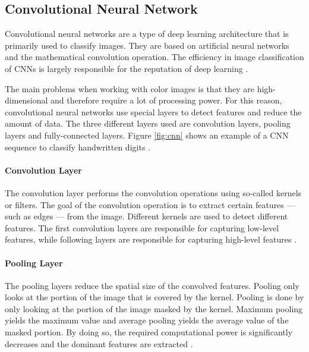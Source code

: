 \subsection{Convolutional Neural Network}
\label{subsec:cnn}

Convolutional neural networks are a type of deep learning architecture that is primarily used to classify images.
They are based on artificial neural networks and the mathematical convolution operation.
The efficiency in image classification of CNNs is largely responsible for the reputation of deep learning \cite{cnn_pathmind}.

The main problems when working with color images is that they are high-dimensional and therefore require a lot of processing power.
For this reason, convolutional neural networks use special layers to detect features and reduce the amount of data.
The three different layers used are convolution layers, pooling layers and fully-connected layers.
Figure \ref{fig:cnn} shows an example of a CNN sequence to classify handwritten digits \cite{cnn_pathmind}.

\paragraph{Convolution Layer}
The convolution layer performs the convolution operations using so-called kernels or filters.
The goal of the convolution operation is to extract certain features --- such as edges --- from the image.
Different kernels are used to detect different features.
The first convolution layers are responsible for capturing low-level features, while following layers are responsible for capturing high-level features \cite{cnn_tds}.
\clearpage

\paragraph{Pooling Layer}
The pooling layers reduce the spatial size of the convolved features.
Pooling only looks at the portion of the image that is covered by the kernel.
Pooling is done by only looking at the portion of the image masked by the kernel.
Maximum pooling yields the maximum value and average pooling yields the average value of the masked portion.
By doing so, the required computational power is significantly decreases and the dominant features are extracted \cite{cnn_tds}.
\\

